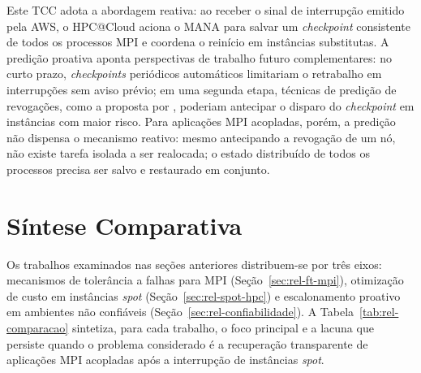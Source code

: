 Este TCC adota a abordagem reativa: ao receber o sinal de interrupção emitido
pela AWS, o HPC@Cloud aciona o MANA para salvar um \textit{checkpoint}
consistente de todos os processos MPI e coordena o reinício em instâncias
substitutas. A predição proativa aponta perspectivas de trabalho futuro
complementares: no curto prazo, \textit{checkpoints} periódicos automáticos
limitariam o retrabalho em interrupções sem aviso prévio; em uma segunda
etapa, técnicas de predição de revogações, como a proposta por
, poderiam antecipar o disparo do
\textit{checkpoint} em instâncias com maior risco. Para aplicações MPI
acopladas, porém, a predição não dispensa o mecanismo reativo: mesmo
antecipando a revogação de um nó, não existe tarefa isolada a ser realocada;
o estado distribuído de todos os processos precisa ser salvo e restaurado em
conjunto.

\section{Síntese Comparativa}
\label{sec:posicionamento}

Os trabalhos examinados nas seções anteriores distribuem-se por três eixos:
mecanismos de tolerância a falhas para MPI (Seção~\ref{sec:rel-ft-mpi}),
otimização de custo em instâncias \textit{spot} (Seção~\ref{sec:rel-spot-hpc})
e escalonamento proativo em ambientes não confiáveis
(Seção~\ref{sec:rel-confiabilidade}). A Tabela~\ref{tab:rel-comparacao}
sintetiza, para cada trabalho, o foco principal e a lacuna que persiste quando
o problema considerado é a recuperação transparente de aplicações MPI acopladas
após a interrupção de instâncias \textit{spot}.

